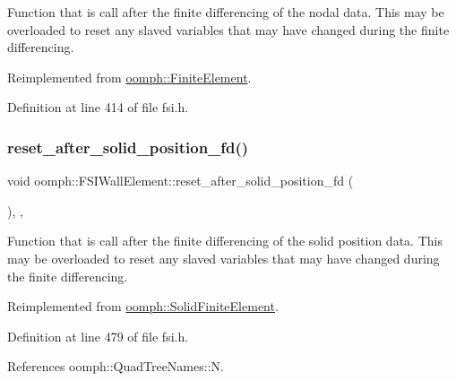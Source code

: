 Function that is call after the finite differencing of the nodal data. This may be overloaded to reset any slaved variables that may have changed during the finite differencing. 



Reimplemented from \hyperlink{classoomph_1_1FiniteElement_a913ae545a274b3631f249e410075e081}{oomph\+::\+Finite\+Element}.



Definition at line 414 of file fsi.\+h.

\mbox{\label{classoomph_1_1FSIWallElement_ae960e2a896fc81320f08cdbda6dc6526}} 
\subsubsection{\texorpdfstring{reset\+\_\+after\+\_\+solid\+\_\+position\+\_\+fd()}{reset\_after\_solid\_position\_fd()}}
{\footnotesize\ttfamily void oomph\+::\+F\+S\+I\+Wall\+Element\+::reset\+\_\+after\+\_\+solid\+\_\+position\+\_\+fd (\begin{DoxyParamCaption}{ }\end{DoxyParamCaption})\hspace{0.3cm}{\ttfamily [inline]}, {\ttfamily [protected]}, {\ttfamily [virtual]}}



Function that is call after the finite differencing of the solid position data. This may be overloaded to reset any slaved variables that may have changed during the finite differencing. 



Reimplemented from \hyperlink{classoomph_1_1SolidFiniteElement_afab2124e079912fe9bf39bf9df8a42c2}{oomph\+::\+Solid\+Finite\+Element}.



Definition at line 479 of file fsi.\+h.



References oomph\+::\+Quad\+Tree\+Names\+::N.

\mbox{\label{classoomph_1_1FSIWallElement_afbfc79cddd641419f297680674daecfd}} 

